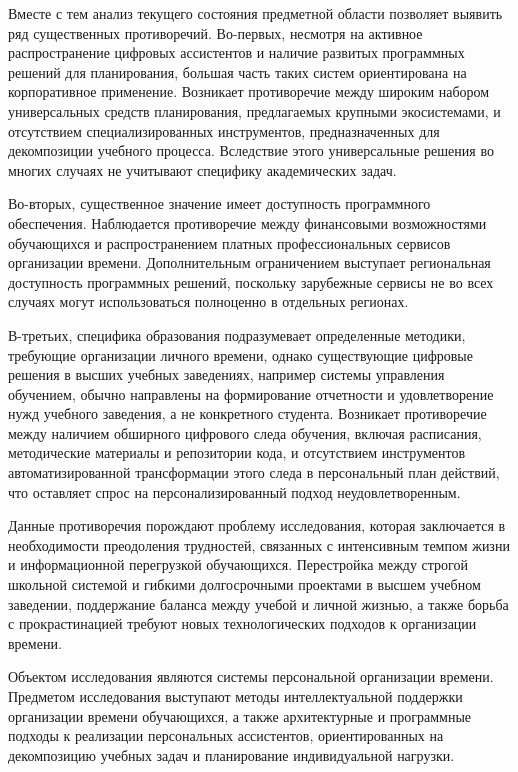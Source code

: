 Вместе с тем анализ текущего состояния предметной области позволяет выявить ряд существенных противоречий. Во-первых, несмотря на активное распространение цифровых ассистентов и наличие развитых программных решений для планирования, большая часть таких систем ориентирована на корпоративное применение. Возникает противоречие между широким набором универсальных средств планирования, предлагаемых крупными экосистемами, и отсутствием специализированных инструментов, предназначенных для декомпозиции учебного процесса. Вследствие этого универсальные решения во многих случаях не учитывают специфику академических задач.

Во-вторых, существенное значение имеет доступность программного обеспечения. Наблюдается противоречие между финансовыми возможностями обучающихся и распространением платных профессиональных сервисов организации времени. Дополнительным ограничением выступает региональная доступность программных решений, поскольку зарубежные сервисы не во всех случаях могут использоваться полноценно в отдельных регионах.

В-третьих, специфика образования подразумевает определенные методики, требующие организации личного времени, однако существующие цифровые решения в высших учебных заведениях, например системы управления обучением, обычно направлены на формирование отчетности и удовлетворение нужд учебного заведения, а не конкретного студента. Возникает противоречие между наличием обширного цифрового следа обучения, включая расписания, методические материалы и репозитории кода, и отсутствием инструментов автоматизированной трансформации этого следа в персональный план действий, что оставляет спрос на персонализированный подход неудовлетворенным.

Данные противоречия порождают проблему исследования, которая заключается в необходимости преодоления трудностей, связанных с интенсивным темпом жизни и информационной перегрузкой обучающихся. Перестройка между строгой школьной системой и гибкими долгосрочными проектами в высшем учебном заведении, поддержание баланса между учебой и личной жизнью, а также борьба с прокрастинацией требуют новых технологических подходов к организации времени.

Объектом исследования являются системы персональной организации времени. Предметом исследования выступают методы интеллектуальной поддержки организации времени обучающихся, а также архитектурные и программные подходы к реализации персональных ассистентов, ориентированных на декомпозицию учебных задач и планирование индивидуальной нагрузки.

